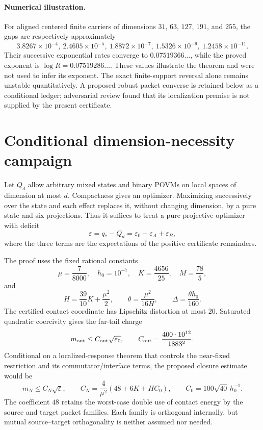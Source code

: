 \documentclass[11pt]{article}
\begin{document}
\paragraph{Numerical illustration.}
For aligned centered finite carriers of dimensions
$31$, $63$, $127$, $191$, and $255$, the gaps are respectively approximately
\[
3.8267\!\times\!10^{-4},\ 2.4605\!\times\!10^{-5},\
1.8872\!\times\!10^{-7},\ 1.5326\!\times\!10^{-9},\
1.2458\!\times\!10^{-11}.
\]
Their successive exponential rates converge to $0.07519366\ldots$, while the
proved exponent is $\log R=0.07519286\ldots$.  These values illustrate the
theorem and were not used to infer its exponent.  The exact finite-support
reversal alone remains unstable quantitatively. A proposed robust packet
converse is retained below as a conditional ledger; adversarial review found
that its localization premise is not supplied by the present certificate.

\section{Conditional dimension-necessity campaign}

Let $Q_d$ allow arbitrary mixed states and binary POVMs on local spaces of
dimension at most $d$.  Compactness gives an optimizer.  Maximizing successively
over the state and each effect replaces it, without changing dimension, by a
pure state and six projections.  Thus it suffices to treat a pure projective
optimizer with deficit
\[
 \varepsilon=q_*-Q_d=\varepsilon_0+\varepsilon_A+\varepsilon_B,
\]
where the three terms are the expectations of the positive certificate
remainders.

The proof uses the fixed rational constants
\[
 \mu=\frac7{8000},\quad h_0=10^{-7},\quad K=\frac{4656}{25},
 \quad M=\frac{78}{5},
\]
and
\[
 H=\frac{39}{10}K+\frac{\mu^2}{2},\qquad
 \theta=\frac{\mu^2}{16H},\qquad
 \Delta=\frac{\theta h_0}{160}.
\]
The certified contact coordinate has Lipschitz distortion at most $20$.
Saturated quadratic coercivity gives the far-tail charge
\[
 m_{\rm out}\le C_{\rm out}\sqrt{\varepsilon_0},
 \qquad C_{\rm out}=\frac{400\cdot10^{12}}{1883^2}.
\]
Conditional on a localized-response theorem that controls the near-fixed
restriction and its commutator/interface terms, the proposed closure estimate
would be
\[
 m_N\le C_N\sqrt\varepsilon,\qquad
 C_N=\frac4{\mu^2}\left(48+6K+HC_0\right),\qquad
 C_0=100\sqrt{40}\,h_0^{-1}.
\]
The coefficient $48$ retains the worst-case double use of contact energy by
the source and target packet families. Each family is orthogonal internally,
but mutual source--target orthogonality is neither assumed nor needed.
\end{document}
